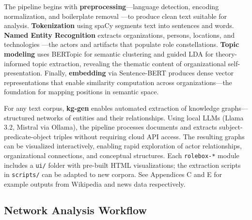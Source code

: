 \documentclass[../main.tex]{subfiles}
\begin{document}
The pipeline begins with \textbf{preprocessing}---language detection, encoding normalization, and boilerplate removal \cite{bird2009nlp}---to produce clean text suitable for analysis. \textbf{Tokenization} using spaCy \cite{honnibal2020spacy} segments text into sentences and words. \textbf{Named Entity Recognition} extracts organizations, persons, locations, and technologies \cite{ner2018survey}---the actors and artifacts that populate role constellations. \textbf{Topic modeling} uses BERTopic \cite{grootendorst2022bertopic} for semantic clustering and guided LDA \cite{blei2003lda} for theory-informed topic extraction, revealing the thematic content of organizational self-presentation. Finally, \textbf{embedding} via Sentence-BERT \cite{reimers2019sentence,devlin2019bert} produces dense vector representations that enable similarity computation across organizations---the foundation for mapping positions in semantic space.

\begin{insightbox}
For any text corpus, \textbf{kg-gen} enables automated extraction of knowledge graphs---structured networks of entities and their relationships. Using local LLMs (Llama 3.2, Mistral via Ollama), the pipeline processes documents and extracts subject-predicate-object triples without requiring cloud API access. The resulting graphs can be visualized interactively, enabling rapid exploration of actor relationships, organizational connections, and conceptual structures. Each \texttt{rolebox-*} module includes a \texttt{ui/} folder with pre-built HTML visualizations; the extraction scripts in \texttt{scripts/} can be adapted to new corpora. See Appendices C and E for example outputs from Wikipedia and news data respectively.
\end{insightbox}

\subsection{Network Analysis Workflow}
\end{document}
